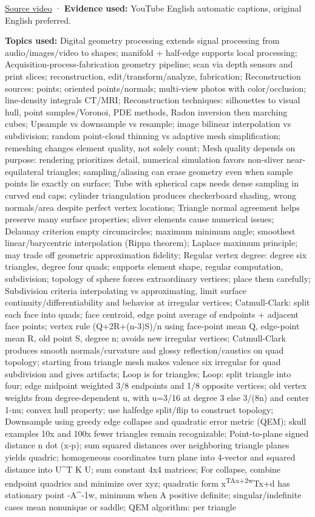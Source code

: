 \href{https://www.youtube.com/watch?v=BwpEoZYcrwY}{Source video} · \textbf{Evidence used:} YouTube English automatic captions, original English preferred.

\textbf{Topics used:} Digital geometry processing extends signal processing from audio/images/video to shapes; manifold + half-edge supports local processing; Acquisition-process-fabrication geometry pipeline; scan via depth sensors and print slices; reconstruction, edit/transform/analyze, fabrication; Reconstruction sources: points; oriented points/normals; multi-view photos with color/occlusion; line-density integrals CT/MRI; Reconstruction techniques: silhouettes to visual hull, point samples/Voronoi, PDE methods, Radon inversion then marching cubes; Upsample vs downsample vs resample; image bilinear interpolation vs subdivision; random point-cloud thinning vs adaptive mesh simplification; remeshing changes element quality, not solely count; Mesh quality depends on purpose: rendering prioritizes detail, numerical simulation favors non-sliver near-equilateral triangles; sampling/aliasing can erase geometry even when sample points lie exactly on surface; Tube with spherical caps needs dense sampling in curved end caps; cylinder triangulation produces checkerboard shading, wrong normals/area despite perfect vertex locations; Triangle normal agreement helps preserve many surface properties; sliver elements cause numerical issues; Delaunay criterion empty circumcircles; maximum minimum angle; smoothest linear/barycentric interpolation (Rippa theorem); Laplace maximum principle; may trade off geometric approximation fidelity; Regular vertex degree: degree six triangles, degree four quads; supports element shape, regular computation, subdivision; topology of sphere forces extraordinary vertices; place them carefully; Subdivision criteria interpolating vs approximating, limit surface continuity/differentiability and behavior at irregular vertices; Catmull-Clark: split each face into quads; face centroid, edge point average of endpoints + adjacent face points; vertex rule (Q+2R+(n-3)S)/n using face-point mean Q, edge-point mean R, old point S, degree n; avoids new irregular vertices; Catmull-Clark produces smooth normals/curvature and glossy reflection/caustics on quad topology; starting from triangle mesh makes valence six irregular for quad subdivision and gives artifacts; Loop is for triangles; Loop: split triangle into four; edge midpoint weighted 3/8 endpoints and 1/8 opposite vertices; old vertex weights from degree-dependent u, with u=3/16 at degree 3 else 3/(8n) and center 1-nu; convex hull property; use halfedge split/flip to construct topology; Downsample using greedy edge collapse and quadratic error metric (QEM); skull examples 10x and 100x fewer triangles remain recognizable; Point-to-plane signed distance n dot (x-p); sum squared distances over neighboring triangle planes yields quadric; homogeneous coordinates turn plane into 4-vector and squared distance into U\^{}T K U; sum constant 4x4 matrices; For collapse, combine endpoint quadrics and minimize over xyz; quadratic form x\textsuperscript{TAx+2w}Tx+d has stationary point -A\^{}-1w, minimum when A positive definite; singular/indefinite cases mean nonunique or saddle; QEM algorithm: per triangle 
